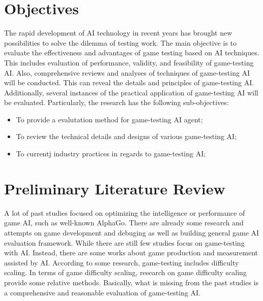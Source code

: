 \documentclass[11pt,en,number]{elegantpaper}
\newcommand{\upcite}[1]{\textsuperscript{\textsuperscript{\cite{#1}}}}
\begin{document}
\section{Objectives}
\noindent
The rapid development of AI technology in recent years has brought new possibilities to solve the dilemma of testing work. The main objective is to evaluate the effectiveness and advantages of game testing based on AI techniques. This includes evaluation of performance, validity, and feasibility of game-testing AI. Also, comprehensive reviews and analyses of techniques of game-testing AI will be conducted. This can reveal the details and principles of game-testing AI. Additionally, several instances of the practical application of game-testing AI will be evaluated. Particularly, the research has the following sub-objectives:
\begin{itemize}
    \item To provide a evalutation method for game-testing AI agent;
    \item To review the technical details and designs of various game-testing AI;
    \item To currentj industry practices in regards to game-testing AI;
\end{itemize}

\section{Preliminary Literature Review}
\noindent
A lot of past studies focused on optimizing the intelligence or performance of game AI, such as well-known AlphaGo\upcite{silver2017mastering}. There are already some research and attempts on game development and debuging\upcite{8477829} as well as building general game AI evaluation framework\upcite{perezliebana2018general}. While there are still few studies focus on game-testing with AI. Instead, there are some works about game production and measurement assisted by AI\upcite{6633663}. According to some research\upcite{tomai2014adapting}, game-testing includes difficulty scaling. In terms of game difficulty scaling, research on game difficulty scaling provide some \upcite{spronck2004difficulty} relative methods. 
Basically, what is missing from the past studies is a comprehensive and reasonable evaluation of game-testing AI.
\end{document}
